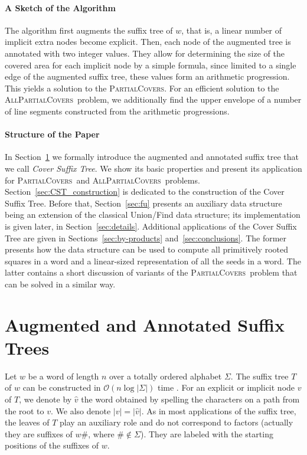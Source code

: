 \documentclass{article}
\theoremstyle{theorem}
\theoremstyle{definition}
\newcommand{\Oh}{\mathcal{O}}
\newcommand{\PC}{{\textsc{PartialCovers}}}
\newcommand{\APC}{{\textsc{AllPartialCovers}}}
\begin{document}
    \paragraph{\bf A Sketch of the Algorithm}
    The algorithm first augments the suffix tree of $w$, that is, a linear number of implicit
    extra nodes become explicit.
    Then, each node of the augmented tree is annotated with two integer values.
    They allow for determining the size of the covered area 
    for each implicit node by a simple formula, since limited to a single edge of the augmented suffix tree,
    these values form an arithmetic progression.
    This yields a solution to the \PC.
    For an efficient solution to the \APC\ problem, we additionally
    find the upper envelope of a number of line segments constructed from the arithmetic progressions.
    
    \paragraph{\bf Structure of the Paper}
    In Section~\ref{sec:CST} we formally introduce the augmented and annotated suffix tree
    that we call \emph{Cover Suffix Tree}.
    We show its basic properties and present its application for \PC\
    and \APC\ problems.
    Section~\ref{sec:CST_construction} is dedicated to the construction
    of the Cover Suffix Tree.
    Before that, Section~\ref{sec:fu} presents an auxiliary data structure being an extension
    of the classical Union/Find data structure; its implementation is given later, in Section~\ref{sec:details}.
    Additional applications of the Cover Suffix Tree are given in Sections~\ref{sec:by-products}
    and~\ref{sec:conclusions}.
    The former presents how the data structure can be used to compute all primitively rooted squares
    in a word and a linear-sized representation of all the seeds in a word.
    The latter contains a short discussion of variants of the \PC\ problem
    that can be solved in a similar way.


  \section{Augmented and Annotated Suffix Trees}\label{sec:CST}
  Let $w$ be a word of length $n$ over a totally ordered alphabet $\Sigma$.
  The suffix tree $T$ of $w$ can be constructed in $\Oh(n\log{|\Sigma|})$ time
  \cite{DBLP:conf/focs/Farach97,DBLP:journals/algorithmica/Ukkonen95}.
  For an explicit or implicit node $v$ of $T$, we denote by $\hat{v}$ the word obtained by spelling
  the characters on a path from the root to $v$.
  We also denote $|v|=|\hat{v}|$.
  As in most applications of the suffix tree,
  the leaves of $T$ play an auxiliary role and do not correspond to factors
  (actually they are suffixes of $w\#$, where $\# \notin \Sigma$).
  They are labeled with the starting positions of the suffixes of $w$.
\end{document}
